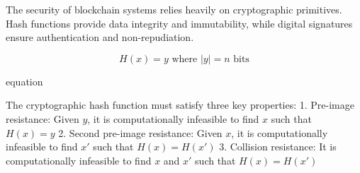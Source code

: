 The security of blockchain systems relies heavily on cryptographic primitives. Hash functions provide data integrity and immutability, while digital signatures ensure authentication and non-repudiation.

\begin{equation}
H(x) = y \text{ where } |y| = n \text{ bits}
\end{equation}

equation

The cryptographic hash function must satisfy three key properties:
1. Pre-image resistance: Given $y$, it is computationally infeasible to find $x$ such that $H(x) = y$
2. Second pre-image resistance: Given $x$, it is computationally infeasible to find $x'$ such that $H(x) = H(x')$
3. Collision resistance: It is computationally infeasible to find $x$ and $x'$ such that $H(x) = H(x')$